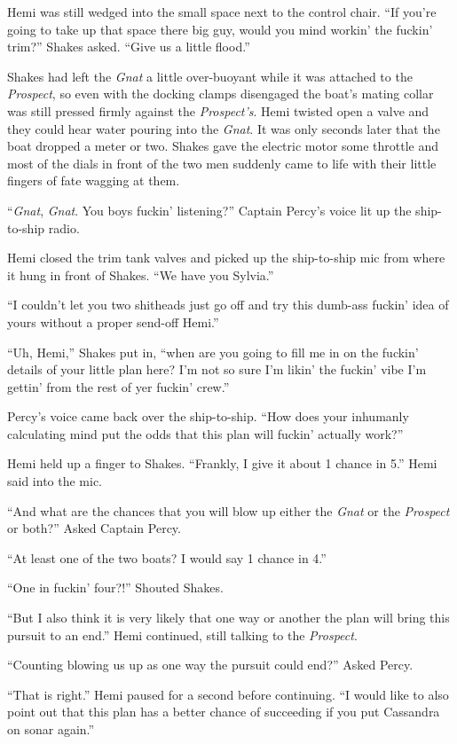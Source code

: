 \documentclass[]{scrbook}
\begin{document}
Hemi was still wedged into the small space next to the control chair.
``If you're going to take up that space there big guy, would you mind
workin' the fuckin' trim?'' Shakes asked. ``Give us a little flood.''

Shakes had left the \emph{Gnat} a little over-buoyant while it was
attached to the \emph{Prospect}, so even with the docking clamps
disengaged the boat's mating collar was still pressed firmly against the
\emph{Prospect's}. Hemi twisted open a valve and they could hear water
pouring into the \emph{Gnat}. It was only seconds later that the boat
dropped a meter or two. Shakes gave the electric motor some throttle and
most of the dials in front of the two men suddenly came to life with
their little fingers of fate wagging at them.

``\emph{Gnat}, \emph{Gnat}. You boys fuckin' listening?'' Captain
Percy's voice lit up the ship-to-ship radio.

Hemi closed the trim tank valves and picked up the ship-to-ship mic from
where it hung in front of Shakes. ``We have you Sylvia.''

``I couldn't let you two shitheads just go off and try this dumb-ass
fuckin' idea of yours without a proper send-off Hemi.''

``Uh, Hemi,'' Shakes put in, ``when are you going to fill me in on the
fuckin' details of your little plan here? I'm not so sure I'm likin' the
fuckin' vibe I'm gettin' from the rest of yer fuckin' crew.''

Percy's voice came back over the ship-to-ship. ``How does your inhumanly
calculating mind put the odds that this plan will fuckin' actually
work?''

Hemi held up a finger to Shakes. ``Frankly, I give it about 1 chance in
5.'' Hemi said into the mic.

``And what are the chances that you will blow up either the \emph{Gnat}
or the \emph{Prospect} or both?'' Asked Captain Percy.

``At least one of the two boats? I would say 1 chance in 4.''

``One in fuckin' four?!'' Shouted Shakes.

``But I also think it is very likely that one way or another the plan
will bring this pursuit to an end.'' Hemi continued, still talking to
the \emph{Prospect}.

``Counting blowing us up as one way the pursuit could end?'' Asked
Percy.

``That is right.'' Hemi paused for a second before continuing. ``I would
like to also point out that this plan has a better chance of succeeding
if you put Cassandra on sonar again.''
\end{document}
